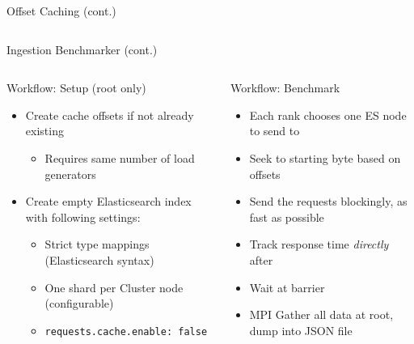 \documentclass[compress,aspectratio=169]{beamer}
\begin{document}
  \begin{frame}[fragile]{Offset Caching (cont.)}
    \begin{tcolorbox}[title=Example \texttt{.offset.json} file for 3 nodes]
    \footnotesize\inputminted[xleftmargin=1em,linenos]{yaml}{./assets/cache.json}
    \end{tcolorbox}
	\end{frame}

  \begin{frame}{Ingestion Benchmarker (cont.)}
    \begin{columns}
      \begin{column}{0.5\textwidth}
        \begin{block}{Workflow: Setup (root only)}
          \begin{itemize}
            \item Create cache offsets if not already existing
              \begin{itemize}
                \item Requires same number of load generators
              \end{itemize}
              \pause
            \item Create empty Elasticsearch index with following settings:
              \begin{itemize}
                \item Strict type mappings\\
                  (Elasticsearch syntax)
                \item One shard per Cluster node (configurable)
                \item \texttt{requests.cache.enable: false}
              \end{itemize}
          \end{itemize}
    \end{block}
      \end{column}
      \pause
      \begin{column}{0.5\textwidth}
        \begin{block}{Workflow: Benchmark}
          \begin{itemize}
            \item Each rank chooses one ES node to send to
              \pause
            \item Seek to starting byte based on offsets
              \pause
            \item Send the requests blockingly, as fast as possible
              \pause
            \item Track response time \emph{directly} after
              \pause
            \item Wait at barrier
              \pause
            \item MPI Gather all data at root, dump into JSON file
          \end{itemize}
        \end{block}
      \end{column}
    \end{columns}
	\end{frame}
\end{document}
